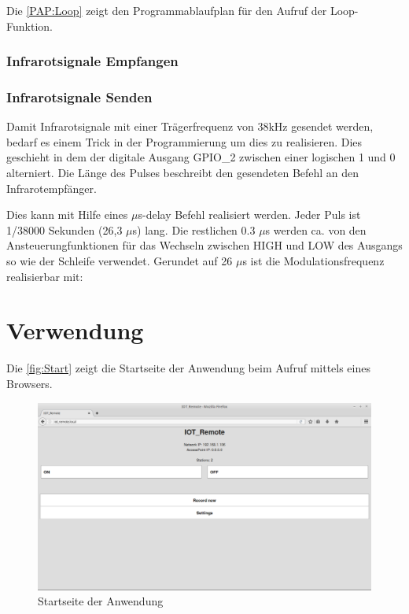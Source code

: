 Die \autoref{PAP:Loop} zeigt den Programmablaufplan für den Aufruf der Loop-Funktion.


\subsubsection{Infrarotsignale Empfangen}
\subsubsection{Infrarotsignale Senden}
Damit Infrarotsignale mit einer Trägerfrequenz von 38kHz gesendet werden, bedarf es einem Trick in der Programmierung um dies zu realisieren.
Dies geschieht in dem der digitale Ausgang \acs{GPIO}\_2 zwischen einer logischen 1 und 0 alterniert.
Die Länge des Pulses beschreibt den gesendeten Befehl an den Infrarotempfänger.

Dies kann mit Hilfe eines $\mu$s-delay Befehl realisiert werden.
Jeder Puls ist 1/38000 Sekunden (26,3 $\mu$s) lang. Die restlichen 0.3 $\mu$s werden ca. von den Ansteuerungfunktionen für das Wechseln zwischen HIGH und LOW des Ausgangs so wie der Schleife verwendet.
Gerundet auf 26 $\mu$s ist die Modulationsfrequenz realisierbar mit:

\section{Verwendung}

Die \autoref{fig:Start} zeigt die Startseite der Anwendung beim Aufruf mittels eines Browsers.

\begin{figure}
	\centering
	\includegraphics[scale=0.3]{Abbildungen/Start}
	\caption{Startseite der Anwendung}
	\label{fig:Start}
\end{figure}

